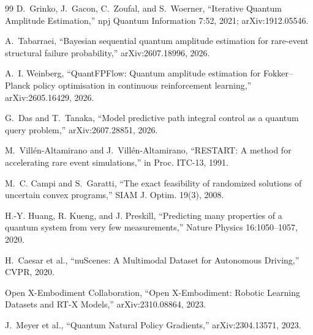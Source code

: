 \documentclass[conference,10pt]{IEEEtran}
\begin{document}
\begin{thebibliography}{99}
 D.~Grinko, J.~Gacon, C.~Zoufal, and S.~Woerner, ``Iterative
Quantum Amplitude Estimation,'' npj Quantum Information 7:52, 2021;
arXiv:1912.05546.

 A.~Tabarraei, ``Bayesian sequential quantum amplitude
estimation for rare-event structural failure probability,'' arXiv:2607.18996,
2026.

 A.~I. Weinberg, ``QuantFPFlow: Quantum amplitude estimation
for Fokker--Planck policy optimisation in continuous reinforcement learning,''
arXiv:2605.16429, 2026.

 G.~Das and T.~Tanaka, ``Model predictive path integral control
as a quantum query problem,'' arXiv:2607.28851, 2026.

 M.~Vill\'en-Altamirano and J.~Vill\'en-Altamirano,
``RESTART: A method for accelerating rare event simulations,'' in Proc. ITC-13,
1991.

 M.~C. Campi and S.~Garatti, ``The exact feasibility of
randomized solutions of uncertain convex programs,'' SIAM J. Optim. 19(3),
2008.

 H.-Y. Huang, R. Kueng, and J. Preskill, ``Predicting many
properties of a quantum system from very few measurements,'' Nature Physics
16:1050--1057, 2020.

 H.~Caesar et al., ``nuScenes: A Multimodal Dataset for
Autonomous Driving,'' CVPR, 2020.

 Open X-Embodiment Collaboration, ``Open X-Embodiment: Robotic
Learning Datasets and RT-X Models,'' arXiv:2310.08864, 2023.

 J.~Meyer et al., ``Quantum Natural Policy Gradients,''
arXiv:2304.13571, 2023.

\end{thebibliography}
\end{document}

